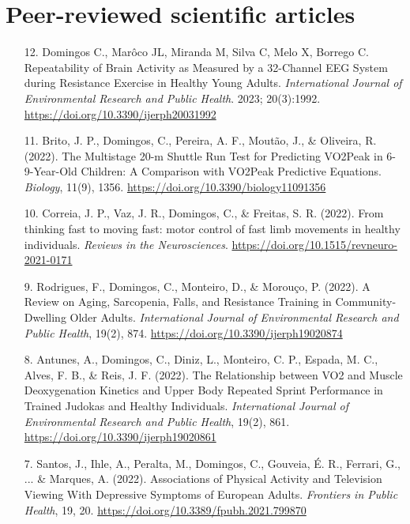 \section*{Peer-reviewed scientific articles}

\begin{enumerate}

  \item[12.] Domingos C., Marôco JL, Miranda M, Silva C, Melo X, Borrego C. Repeatability of Brain Activity as Measured by a 32-Channel EEG System during Resistance Exercise in Healthy Young Adults. \emph{International Journal of Environmental Research and Public Health}. 2023; 20(3):1992. \url{https://doi.org/10.3390/ijerph20031992}

  \item[11.] Brito, J. P., Domingos, C., Pereira, A. F., Moutão, J., \& Oliveira, R. (2022). The Multistage 20-m Shuttle Run Test for Predicting VO2Peak in 6-9-Year-Old Children: A Comparison with VO2Peak Predictive Equations. \emph{Biology}, 11(9), 1356. \url{https://doi.org/10.3390/biology11091356}

  \item[10.] Correia, J. P., Vaz, J. R., Domingos, C., \& Freitas, S. R. (2022). From thinking fast to moving fast: motor control of fast limb movements in healthy individuals. \emph{Reviews in the Neurosciences}. \url{https://doi.org/10.1515/revneuro-2021-0171}

  \item[9.] Rodrigues, F., Domingos, C., Monteiro, D., \& Morouço, P. (2022). A Review on Aging, Sarcopenia, Falls, and Resistance Training in Community-Dwelling Older Adults. \emph{International Journal of Environmental Research and Public Health}, 19(2), 874. \url{https://doi.org/10.3390/ijerph19020874}

  \item[8.] Antunes, A., Domingos, C., Diniz, L., Monteiro, C. P., Espada, M. C., Alves, F. B., \& Reis, J. F. (2022). The Relationship between VO2 and Muscle Deoxygenation Kinetics and Upper Body Repeated Sprint Performance in Trained Judokas and Healthy Individuals. \emph{International Journal of Environmental Research and Public Health}, 19(2), 861. \url{https://doi.org/10.3390/ijerph19020861}

  \item[7.] Santos, J., Ihle, A., Peralta, M., Domingos, C., Gouveia, É. R., Ferrari, G., ... \& Marques, A. (2022). Associations of Physical Activity and Television Viewing With Depressive Symptoms of European Adults. \emph{Frontiers in Public Health}, 19, 20. \url{https://doi.org/10.3389/fpubh.2021.799870}


\end{enumerate}
